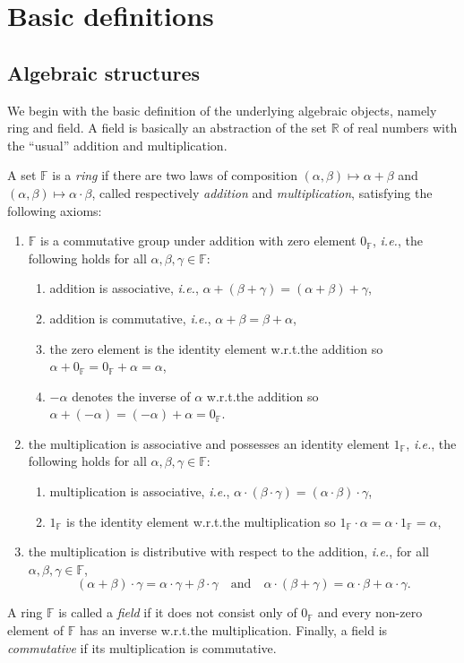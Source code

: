 \documentclass[a4paper]{paper}
\newcommand{\Field}{\mathbb{F}}
\newcommand{\Real}{\mathbb{R}}
\newcommand{\ie}{\textsl{i.e.}\xspace}
\begin{document}
\cleardoublepage
\appendix
\section{Basic definitions}
\subsection{Algebraic structures}
We begin with the basic definition of the underlying algebraic objects, namely ring and field.
A field is basically an abstraction of the set $\Real$ of real numbers with the ``usual'' 
addition and multiplication.
\begin{definition}
  A set $\Field$ is a \emph{ring} if there are two laws of composition
  $(\alpha,\beta)\mapsto \alpha+\beta$ and $(\alpha,\beta) \mapsto \alpha\cdot \beta$, called 
  respectively \emph{addition} and \emph{multiplication}, satisfying the following axioms:
  \begin{enumerate}
  \item $\Field$ is a commutative group under addition with zero element $0_{\Field}$, \ie,
    the following holds for all $\alpha,\beta,\gamma\in \Field$:
    \begin{enumerate}
    \item addition is associative, \ie, $\alpha + (\beta+\gamma)=(\alpha+\beta)+\gamma$,
    \item addition is commutative, \ie, $\alpha + \beta = \beta+\alpha$,
    \item the zero element is the identity element w.r.t.\@ the addition so 
       $\alpha+0_{\Field}=0_{\Field}+\alpha=\alpha$,
    \item $-\alpha$ denotes the inverse of $\alpha$  w.r.t.\@ the addition so 
       $\alpha+(-\alpha)=(-\alpha)+\alpha=0_{\Field}$.
    \end{enumerate}
  \item the multiplication is associative and possesses an identity element $1_{\Field}$, \ie,
    the following holds for all $\alpha,\beta,\gamma\in \Field$:
    \begin{enumerate}
    \item multiplication is associative, \ie, 
      $\alpha\cdot (\beta\cdot \gamma)=(\alpha\cdot \beta)\cdot \gamma$,
   \item $1_{\Field}$ is the identity element w.r.t.\@ the multiplication so 
      $1_{\Field}\cdot \alpha=\alpha \cdot 1_{\Field}=\alpha$, 
  \end{enumerate}
  \item the multiplication is distributive with respect to the addition, \ie,
    for all $\alpha,\beta,\gamma\in \Field$,
    \[ (\alpha+\beta)\cdot \gamma = \alpha \cdot \gamma+\beta\cdot\gamma 
       \quad\text{and}\quad
       \alpha \cdot (\beta + \gamma) = \alpha \cdot \beta+\alpha\cdot\gamma.
    \]
  \end{enumerate}
  A ring $\Field$ is called a \emph{field} if it does not consist only of $0_{\Field}$ and every non-zero 
  element of $\Field$ has an inverse w.r.t.\@ the multiplication. Finally, a field is \emph{commutative}
  if its multiplication is commutative.
\end{definition}
\end{document}
